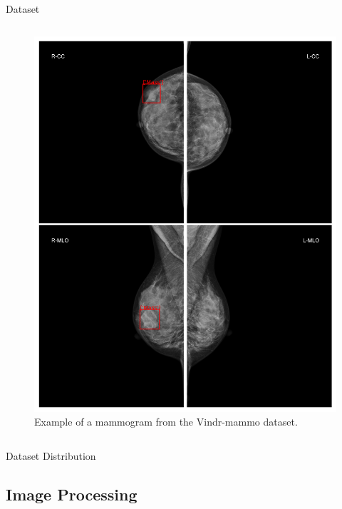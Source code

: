 \begin{frame}{Dataset}
\begin{columns}
        \begin{column}{0.5\textwidth}
            \begin{figure}
                \centering
                \includegraphics[height=0.7\textheight,keepaspectratio]{imagenes/vista_vindr.png}
                \caption{Example of a mammogram from the Vindr-mammo dataset.}
            \end{figure}
        \end{column}
    \end{columns}
\end{frame}

\begin{frame}{Dataset Distribution}
    
\end{frame}

\subsection{Image Processing}

